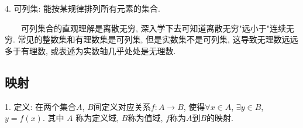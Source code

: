   
4. 可列集: 能按某规律排列所有元素的集合. 

\begin{tcolorbox}[colback=gray!5,colframe=orange!75!black,title=注意事项]
    ~~~~可列集合的直观理解是离散无穷, 深入学下去可知道离散无穷"远小于"连续无穷. 常见的整数集和有理数集是可列集, 
    但是实数集不是可列集, 这导致无理数远远多于有理数, 或表述为实数轴几乎处处是无理数.
\end{tcolorbox}

\subsection{映射}

1. 定义: 在两个集合$A$, $B$间定义对应关系$f: A\rightarrow B$, 使得$\forall x \in A$, $\exists y \in B$, $y=f(x)$. 其中
$A$ 称为定义域, $B$称为值域, $f$称为$A$到$B$的映射.





